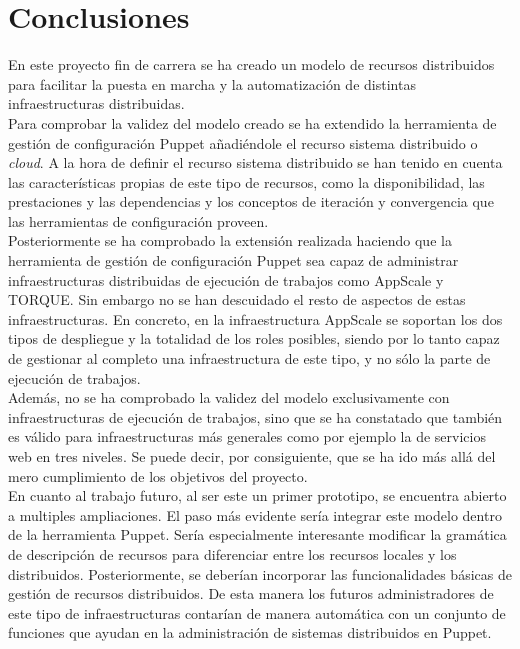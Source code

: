\chapter{Conclusiones}
\label{cap:conclusiones}


En este proyecto fin de carrera se ha creado un modelo de recursos distribuidos para facilitar la puesta en marcha y la automatización de distintas infraestructuras distribuidas. \\

Para comprobar la validez del modelo creado se ha extendido la herramienta de gestión de configuración Puppet añadiéndole el recurso sistema distribuido o \emph{cloud}. A la hora de definir el recurso sistema distribuido se han tenido en cuenta las características propias de este tipo de recursos, como la disponibilidad, las prestaciones y las dependencias y los conceptos de iteración y convergencia que las herramientas de configuración proveen. \\

Posteriormente se ha comprobado la extensión realizada haciendo que la herramienta de gestión de configuración Puppet sea capaz de administrar infraestructuras distribuidas de ejecución de trabajos como AppScale y TORQUE. Sin embargo no se han descuidado el resto de aspectos de estas infraestructuras. En concreto, en la infraestructura AppScale se soportan los dos tipos de despliegue y la totalidad de los roles posibles, siendo por lo tanto capaz de gestionar al completo una infraestructura de este tipo, y no sólo la parte de ejecución de trabajos. \\

Además, no se ha comprobado la validez del modelo exclusivamente con infraestructuras de ejecución de trabajos, sino que se ha constatado que también es válido para infraestructuras más generales como por ejemplo la de servicios web en tres niveles. Se puede decir, por consiguiente, que se ha ido más allá del mero cumplimiento de los objetivos del proyecto. \\

En cuanto al trabajo futuro, al ser este un primer prototipo, se encuentra abierto a multiples ampliaciones. El paso más evidente sería integrar este modelo dentro de la herramienta Puppet. Sería especialmente interesante modificar la gramática de descripción de recursos para diferenciar entre los recursos locales y los distribuidos. Posteriormente, se deberían incorporar las funcionalidades básicas de gestión de recursos distribuidos. De esta manera los futuros administradores de este tipo de infraestructuras contarían de manera automática con un conjunto de funciones que ayudan en la administración de sistemas distribuidos en Puppet.

